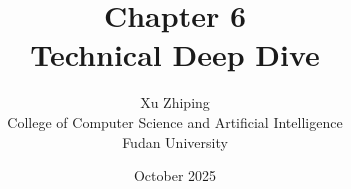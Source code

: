 \documentclass[11pt,letterpaper]{book}
\begin{document}
\title{Chapter 6\\
\large Technical Deep Dive}
\author{Xu Zhiping\\
\small College of Computer Science and Artificial Intelligence\\
\small Fudan University}
\date{October 2025}
\maketitle

\tableofcontents

\setcounter{chapter}{5}




\printindex
\end{document}
